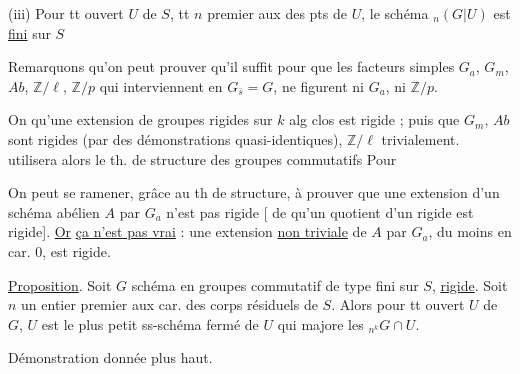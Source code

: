 (iii) Pour tt  ouvert $U$ de $S$, tt  $n$ premier aux   des pts de $U$, le schéma $ {}_n(G|U)$ est \uline{fini} sur $S$\unsure{]}

 Remarquons qu'on peut prouver qu'il  suffit pour  que    les facteurs simples $G_a$, $G_m$, $Ab$, $\mathbb Z/\ell$, $\mathbb Z/p$ qui interviennent en $G_{\bar s}=G$, ne figurent ni $G_a$, ni $\mathbb Z/p$. 

  On  qu'une extension de groupes rigides sur $k$ alg clos est rigide ; puis  que $G_m$, $Ab$ sont rigides (par des démonstrations quasi-identiques), $\mathbb Z/\ell$  trivialement.  utilisera alors le th. de structure des groupes commutatifs  Pour 

On  peut se ramener, grâce au th de structure, à prouver que une extension d'un schéma abélien $A$ par $G_a$ n'est pas rigide [ de  qu'un quotient d'un rigide est rigide]. \uline{Or} \uline{ça n'est pas vrai} : une extension \uline{non triviale} de $A$ par $G_a$, du moins en car. 0, est rigide.

\uline{Proposition}. Soit $G$ schéma en groupes commutatif  de type fini sur $S$, \uline{rigide}. Soit $n$ un entier premier aux car. des corps résiduels de $S$. Alors  pour tt ouvert $U$ de $G$, $U$ est le plus petit ss-schéma fermé de $U$ qui majore les $ {}_{n^k}G\cap U$.

Démonstration donnée plus haut.

